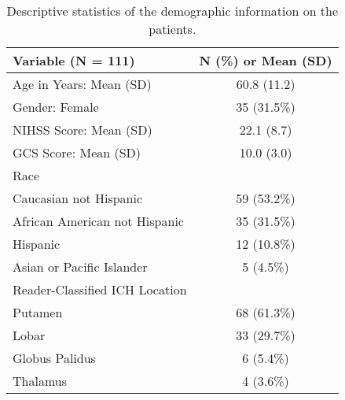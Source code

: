 \begin{table}[ht]
\centering
\begin{tabular}{lc}
  \hline {\bf Variable (N = 111)} & {\bf N (\%) or Mean (SD)} \\ 
  \hline
Age in Years: Mean (SD) & 60.8 (11.2) \\ 
   \hline
Gender: Female & 35 (31.5\%) \\ 
   \hline
NIHSS Score: Mean (SD) & 22.1 (8.7) \\ 
   \hline
GCS Score: Mean (SD) & 10.0 (3.0) \\ 
   \hline
Race &  \\ 
   \hline
\text{  } Caucasian not Hispanic & 59 (53.2\%) \\ 
   \hline
\text{  } African American not Hispanic & 35 (31.5\%) \\ 
   \hline
\text{  } Hispanic & 12 (10.8\%) \\ 
   \hline
\text{  } Asian or Pacific Islander & 5 (4.5\%) \\ 
   \hline
Reader-Classified ICH Location &  \\ 
   \hline
\text{  } Putamen & 68 (61.3\%) \\ 
   \hline
\text{  } Lobar & 33 (29.7\%) \\ 
   \hline
\text{  } Globus Palidus & 6 (5.4\%) \\ 
   \hline
\text{  } Thalamus & 4 (3.6\%) \\ 
   \hline
\end{tabular}
\caption{Descriptive statistics of the demographic information on the patients.} 
\label{t:dem}
\end{table}
